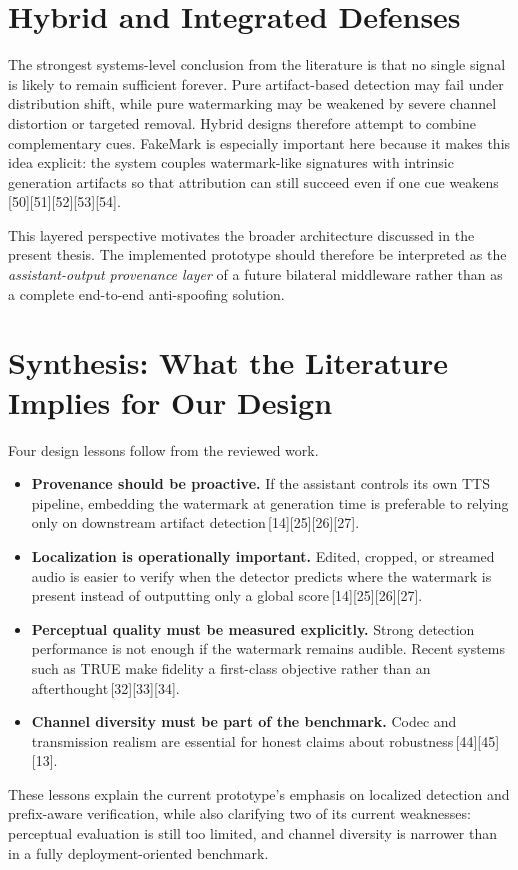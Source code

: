 \section{Hybrid and Integrated Defenses}
The strongest systems-level conclusion from the literature is that no single signal is likely to remain sufficient forever. Pure artifact-based detection may fail under distribution shift, while pure watermarking may be weakened by severe channel distortion or targeted removal. Hybrid designs therefore attempt to combine complementary cues. FakeMark is especially important here because it makes this idea explicit: the system couples watermark-like signatures with intrinsic generation artifacts so that attribution can still succeed even if one cue weakens\,[50][51][52][53][54].

This layered perspective motivates the broader architecture discussed in the present thesis. The implemented prototype should therefore be interpreted as the \emph{assistant-output provenance layer} of a future bilateral middleware rather than as a complete end-to-end anti-spoofing solution.

\section{Synthesis: What the Literature Implies for Our Design}
Four design lessons follow from the reviewed work.
\begin{itemize}[leftmargin=1.25em]
  \item \textbf{Provenance should be proactive.} If the assistant controls its own TTS pipeline, embedding the watermark at generation time is preferable to relying only on downstream artifact detection\,[14][25][26][27].
  \item \textbf{Localization is operationally important.} Edited, cropped, or streamed audio is easier to verify when the detector predicts where the watermark is present instead of outputting only a global score\,[14][25][26][27].
  \item \textbf{Perceptual quality must be measured explicitly.} Strong detection performance is not enough if the watermark remains audible. Recent systems such as TRUE make fidelity a first-class objective rather than an afterthought\,[32][33][34].
  \item \textbf{Channel diversity must be part of the benchmark.} Codec and transmission realism are essential for honest claims about robustness\,[44][45][13].
\end{itemize}
These lessons explain the current prototype's emphasis on localized detection and prefix-aware verification, while also clarifying two of its current weaknesses: perceptual evaluation is still too limited, and channel diversity is narrower than in a fully deployment-oriented benchmark.

